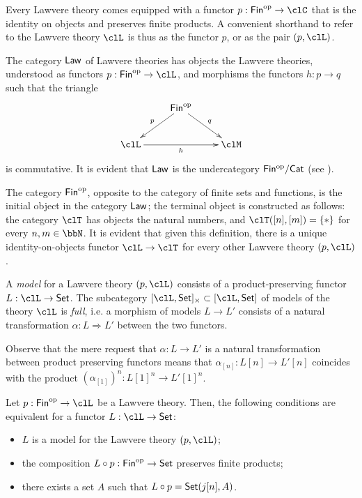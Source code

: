 Every Lawvere theory comes equipped with a functor $p : \cate{Fin}^\op \to \clC$ that is the identity on objects and preserves finite products. A convenient shorthand to refer to the Lawvere theory $\clL$ is thus as the functor $p$, or as the pair $(p,\clL)$.
\begin{definition}
  The category $\mathsf{Law}$ of Lawvere theories has objects the Lawvere theories, understood as functors $p : \cate{Fin}^\op \to \clL$, and morphisms the functors $h :  p\to q$ such that the triangle 
  \[\xymatrix{
    & \cate{Fin}^\op \ar[dr]^q \ar[dl]_p & \\ 
    \clL \ar[rr]_h && \clM 
  }\]
  is commutative. It is evident that $\mathsf{Law}$ is the undercategory $\mathsf{Fin^{\text{op}}}/\mathsf{Cat}$ (see \cite[]{}).
\end{definition}
\begin{example}
The category $\mathsf{Fin}^{\text{op}}$, opposite to the category of finite sets and functions, is the initial object in the category  $\mathsf{Law}$; the terminal object is constructed as follows: the category $\clT$ has objects the natural numbers, and $\clT([n],[m])=\{*\}$ for every $n,m\in \bbN$. It is evident that given this definition, there is a unique identity-on-objects functor $\clL \to \clT$ for every other Lawvere theory $(p,\clL)$.
\end{example}
\begin{definition}
    A \emph{model} for a Lawvere theory $(p ,\clL)$ consists of a product-preserving functor $L : \clL \to \Set$. The subcategory $[\clL,\Set]_\times \subset [\clL, \Set]$ of models of the theory $\clL$ is \emph{full}, i.e. a morphism of models $L \to L'$ consists of a natural transformation $\alpha : L \Rightarrow L'$ between the two functors.
\end{definition}
Observe that the mere request that $\alpha : L \to L'$ is a natural transformation between product preserving functors means that $\alpha_{[n]} : L[n] \to L'[n]$ coincides with the product $(\alpha_{[1]})^n : L[1]^n \to L'[1]^n$.
\begin{proposition}
  Let $p : \cate{Fin}^\op\to \clL$ be a Lawvere theory. Then, the following conditions are equivalent for a functor $L : \clL \to \Set$:
  \begin{itemize}
    \item $L$ is a model for the Lawvere theory $(p,\clL)$;
    \item the composition $L\circ p : \mathsf{Fin}^{\text{op}} \to \mathsf{Set}$ preserves finite products;
    \item there exists a set $A$ such that $L\circ p = \mathsf{Set}(j[n],A)$.
  \end{itemize}
\end{proposition}
